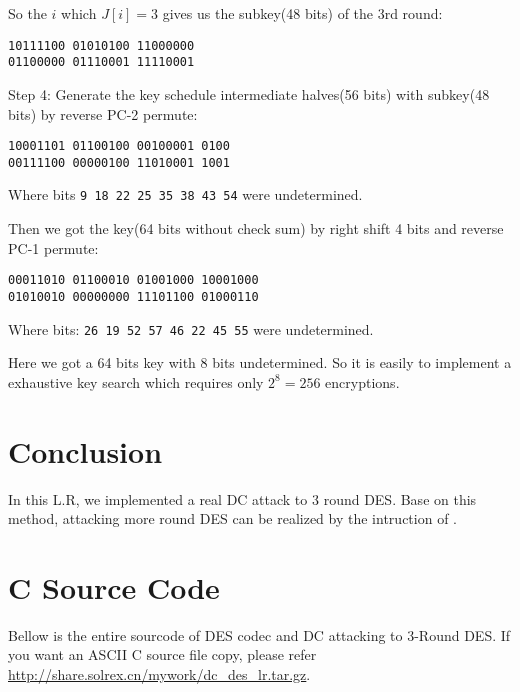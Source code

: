 \documentclass[a4paper,10pt]{article}
\begin{document}
So the $i$ which $J[i] = 3$ gives us the subkey(48 bits) of the 3rd round:
\begin{center}
\texttt{10111100 01010100 11000000}\\
\texttt{01100000 01110001 11110001}
\end{center}

\noindent\textsf{Step 4:} Generate the key schedule intermediate halves(56 bits) with subkey(48 bits) by reverse PC-2 permute\cite{DES}:
\begin{center}
\texttt{10001101 01100100 00100001 0100}\\
\texttt{00111100 00000100 11010001 1001}
\end{center}
Where bits \texttt{9 18 22 25 35 38 43 54} were undetermined.

Then we got the key(64 bits without check sum) by right shift 4 bits and reverse PC-1 permute\cite{DES}:
\begin{center}
\texttt{00011010 01100010 01001000 10001000}\\
\texttt{01010010 00000000 11101100 01000110}
\end{center}
Where bits: \texttt{26 19 52 57 46 22 45 55} were undetermined.

Here we got a 64 bits key with 8 bits undetermined. So it is easily to implement a exhaustive key search which requires only $2^8=256$ encryptions.

\section{Conclusion}

In this L.R, we implemented a real DC attack to 3 round DES. Base on this method, attacking more round DES can be realized by the intruction of \cite{BIHA91}.

\section{C Source Code}

Bellow is the entire sourcode of DES codec and DC attacking to 3-Round DES. If you want an ASCII C source file copy, please refer \url{http://share.solrex.cn/mywork/dc_des_lr.tar.gz}.

\end{document}
